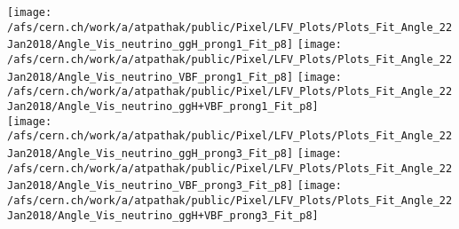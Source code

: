 \documentclass{beamer}
\begin{document}
\begin{frame}
\begin{normalsize}
\begin{center}
\texttt{[image: /afs/cern.ch/work/a/atpathak/public/Pixel/LFV\_Plots/Plots\_Fit\_Angle\_22Jan2018/Angle\_Vis\_neutrino\_ggH\_prong1\_Fit\_p8]}
\texttt{[image: /afs/cern.ch/work/a/atpathak/public/Pixel/LFV\_Plots/Plots\_Fit\_Angle\_22Jan2018/Angle\_Vis\_neutrino\_VBF\_prong1\_Fit\_p8]}
\texttt{[image: /afs/cern.ch/work/a/atpathak/public/Pixel/LFV\_Plots/Plots\_Fit\_Angle\_22Jan2018/Angle\_Vis\_neutrino\_ggH+VBF\_prong1\_Fit\_p8]}\\
\texttt{[image: /afs/cern.ch/work/a/atpathak/public/Pixel/LFV\_Plots/Plots\_Fit\_Angle\_22Jan2018/Angle\_Vis\_neutrino\_ggH\_prong3\_Fit\_p8]}
\texttt{[image: /afs/cern.ch/work/a/atpathak/public/Pixel/LFV\_Plots/Plots\_Fit\_Angle\_22Jan2018/Angle\_Vis\_neutrino\_VBF\_prong3\_Fit\_p8]}
\texttt{[image: /afs/cern.ch/work/a/atpathak/public/Pixel/LFV\_Plots/Plots\_Fit\_Angle\_22Jan2018/Angle\_Vis\_neutrino\_ggH+VBF\_prong3\_Fit\_p8]}\\
\end{center}
\end{normalsize}
\end {frame}
\end{document}
